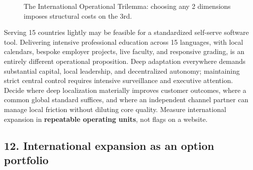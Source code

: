 \begin{figure}[htbp]
\centering
{}
\caption{The International Operational Trilemma: choosing any 2 dimensions imposes structural costs on the 3rd.}
\label{fig:trilemma}
\end{figure}

Serving 15 countries lightly may be feasible for a standardized self-serve software tool. Delivering intensive professional education across 15 languages, with local calendars, bespoke employer projects, live faculty, and responsive grading, is an entirely different operational proposition. Deep adaptation everywhere demands substantial capital, local leadership, and decentralized autonomy; maintaining strict central control requires intensive surveillance and executive attention. Decide where deep localization materially improves customer outcomes, where a common global standard suffices, and where an independent channel partner can manage local friction without diluting core quality. Measure international expansion in \textbf{repeatable operating units}, not flags on a website.

\subsection{12. International expansion as an option portfolio}

